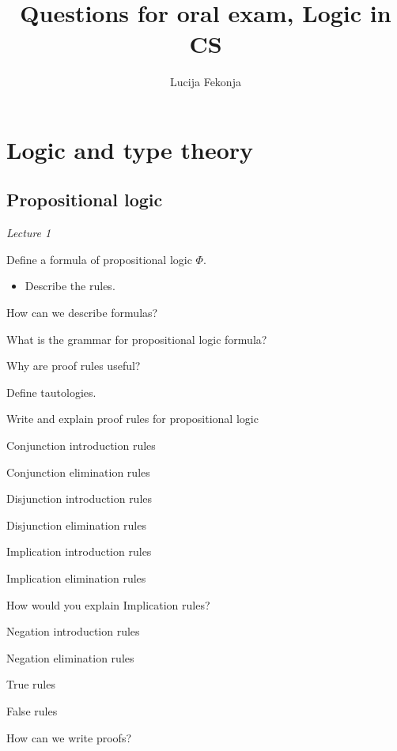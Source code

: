 \documentclass[fleqn]{article}
\title{Questions for oral exam, Logic in CS}
\author{Lucija Fekonja}
\begin{document}
\maketitle

\section{Logic and type theory}

\subsection{Propositional logic}
\textit{Lecture 1}
\begin{enumerate}
    {\color{red}\item Define a formula of propositional logic $\Phi$.}
    \begin{itemize}
        \item Describe the rules.
    \end{itemize}
    {\color{red}\item How can we describe formulas?}
    \item What is the grammar for propositional logic formula?
    {\color{red}\item Why are proof rules useful?}
    {\color{red}\item Define tautologies.}
    \item Write and explain proof rules for propositional logic
    \begin{itemize}
        \item Conjunction introduction rules
        \item Conjunction elimination rules
        \item Disjunction introduction rules
        {\color{red}\item Disjunction elimination rules}
        \item Implication introduction rules
        \item Implication elimination rules
        {\color{red}\item How would you explain Implication rules?}
        {\color{red}\item Negation introduction rules}
        {\color{red}\item Negation elimination rules}
        {\color{red}\item True rules}
        {\color{red}\item False rules}
    \end{itemize}
    \item How can we write proofs?

\end{enumerate}
\end{document}
